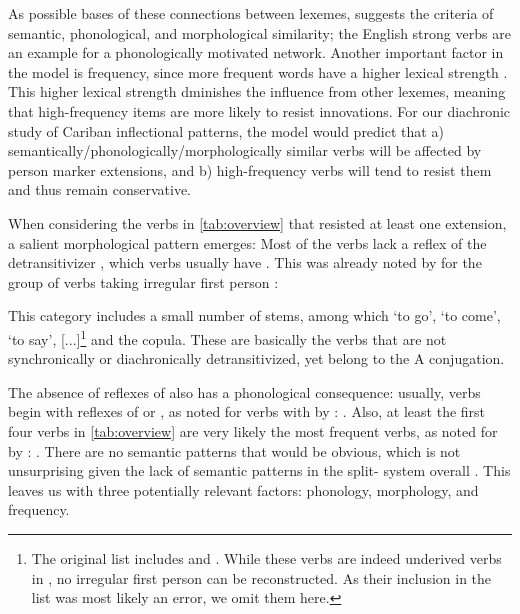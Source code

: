 As possible bases of these connections between lexemes, \textcite[118]{bybee1985morphology} suggests the criteria of semantic, phonological, and morphological similarity; the English strong verbs are an example for a phonologically motivated network.
Another important factor in the model is frequency, since more frequent words have a higher lexical strength \parencite[119]{bybee1985morphology}.
This higher lexical strength dminishes the influence from other lexemes, meaning that high-frequency items are more likely to resist innovations.
For our diachronic study of Cariban inflectional patterns, the model would predict that a) semantically\slash{}phonologically\slash\hspace{0pt}morphologically similar verbs will be affected by person marker extensions, and b) high-frequency verbs will tend to resist them and thus remain conservative.

When considering the verbs in \cref{tab:overview} that resisted at least one extension, a salient morphological pattern emerges:
Most of the verbs lack a reflex of the detransitivizer \detrz, which   verbs usually have .
This was already noted by \textcite{meira1998proto} for the group of \PTar verbs taking irregular first person :
\begin{quotebox}{\parencite[112]{meira1998proto}}
	This category includes a small number of stems, among which ‘to go’, ‘to come’, ‘to say’, [...]\footnote{The original list includes  and . While these verbs are indeed underived  verbs in \trio, no irregular first person  can be reconstructed. As their inclusion in the list was most likely an error, we omit them here.} and the copula. These are basically the verbs that are not synchronically or diachronically detransitivized, yet belong to the A conjugation.
\end{quotebox} %
%
The absence of reflexes of \detrz also has a phonological consequence: usually,  verbs begin with reflexes of  or , as noted for \arara verbs with  by \textcite[153]{alves2017arara}: .
Also, at least the first four verbs in \cref{tab:overview} are very likely the most frequent  verbs, as noted for \kalina by \textcite[75]{courtz2008carib}: .
%
There are no semantic patterns that would be obvious, which is not unsurprising given the lack of semantic patterns in the split- system overall .
This leaves us with three potentially relevant factors: phonology, morphology, and frequency.

